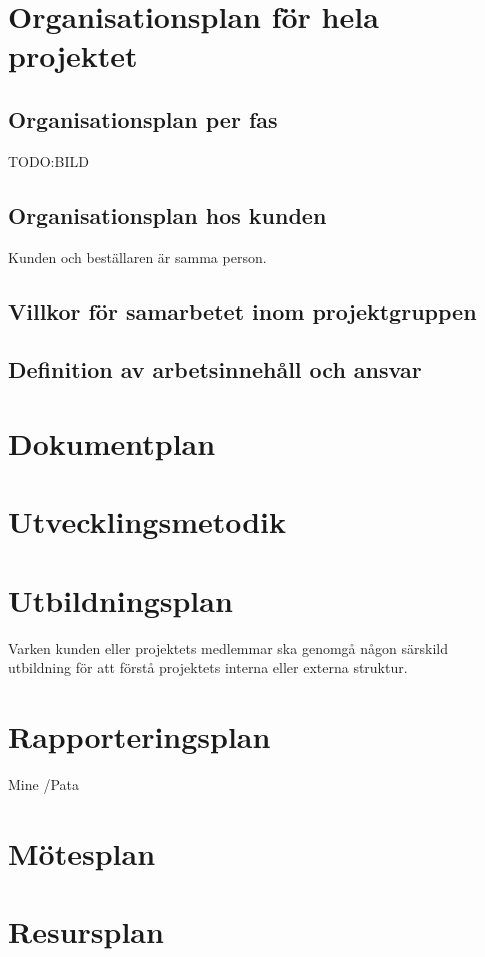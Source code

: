 \documentclass{article}
\begin{document}
\section{Organisationsplan för hela projektet}

\subsection{Organisationsplan per fas}
TODO:BILD

\subsection{Organisationsplan hos kunden}
Kunden och beställaren är samma person.

\subsection{Villkor för samarbetet inom projektgruppen}

\subsection{Definition av arbetsinnehåll och ansvar}

\section{Dokumentplan}


\section{Utvecklingsmetodik}

\section{Utbildningsplan}
Varken kunden eller projektets medlemmar ska genomgå någon särskild utbildning för att förstå projektets interna eller externa struktur.

\section{Rapporteringsplan}
Mine /Pata

\section{Mötesplan}
\section{Resursplan}
\end{document}
